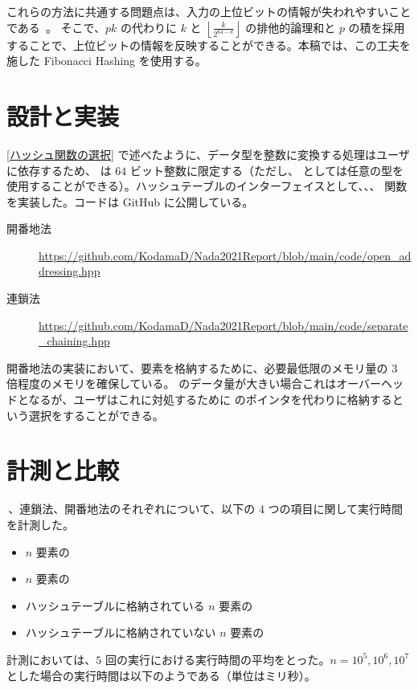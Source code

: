 \documentclass[dvipdfmx,a4j,10pt]{jarticle}
\begin{document}
これらの方法に共通する問題点は、入力の上位ビットの情報が失われやすいことである~\cite{FibHash}。
そこで、$pk$ の代わりに $k$ と $\displaystyle \left\lfloor \frac{k}{2^{64-d}} \right\rfloor$ の排他的論理和と $p$ の積を採用することで、上位ビットの情報を反映することができる。本稿では、この工夫を施した Fibonacci Hashing を使用する。

\section{設計と実装}

\ref{ハッシュ関数の選択} で述べたように、データ型を整数に変換する処理はユーザに依存するため、 は $64$ ビット整数に限定する（ただし、 としては任意の型を使用することができる）。ハッシュテーブルのインターフェイスとして、、、 関数を実装した。コードは GitHub に公開している。

\begin{description}
  \item[開番地法] \url{https://github.com/KodamaD/Nada2021Report/blob/main/code/open_addressing.hpp}
  \item[連鎖法] \url{https://github.com/KodamaD/Nada2021Report/blob/main/code/separate_chaining.hpp}
\end{description}

開番地法の実装において、要素を格納するために、必要最低限のメモリ量の $3$ 倍程度のメモリを確保している。 のデータ量が大きい場合これはオーバーヘッドとなるが、ユーザはこれに対処するために  のポインタを代わりに格納するという選択をすることができる。

\section{計測と比較}

\,、連鎖法、開番地法のそれぞれについて、以下の $4$ つの項目に関して実行時間を計測した。

\begin{itemize}
  \item $n$ 要素の 
  \item $n$ 要素の 
  \item ハッシュテーブルに格納されている $n$ 要素の 
  \item ハッシュテーブルに格納されていない $n$ 要素の 
\end{itemize}

計測においては、$5$ 回の実行における実行時間の平均をとった。$n = 10^5, 10^6, 10^7$ とした場合の実行時間は以下のようである（単位はミリ秒）。
\end{document}
